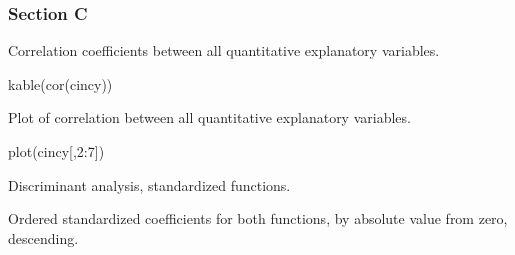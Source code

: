\documentclass[
  letterpaper,
  DIV=11,
  numbers=noendperiod]{scrartcl}
\newenvironment{Shaded}{\begin{snugshade}}{\end{snugshade}}
\newcommand{\DecValTok}[1]{\textcolor[rgb]{0.68,0.00,0.00}{#1}}
\newcommand{\FunctionTok}[1]{\textcolor[rgb]{0.28,0.35,0.67}{#1}}
\newcommand{\NormalTok}[1]{\textcolor[rgb]{0.00,0.23,0.31}{#1}}
\newcommand{\SpecialCharTok}[1]{\textcolor[rgb]{0.37,0.37,0.37}{#1}}
\begin{document}
\hypertarget{section-c}{%
\subsubsection{Section C}\label{section-c}}

Correlation coefficients between all quantitative explanatory variables.

\begin{Shaded}
\begin{Highlighting}[]
\FunctionTok{kable}\NormalTok{(}\FunctionTok{cor}\NormalTok{(cincy))}
\end{Highlighting}
\end{Shaded}

Plot of correlation between all quantitative explanatory variables.

\begin{Shaded}
\begin{Highlighting}[]
\FunctionTok{plot}\NormalTok{(cincy[,}\DecValTok{2}\SpecialCharTok{:}\DecValTok{7}\NormalTok{])}
\end{Highlighting}
\end{Shaded}

Discriminant analysis, standardized functions.

\begin{Shaded}
\end{Shaded}

Ordered standardized coefficients for both functions, by absolute value
from zero, descending.
\end{document}
